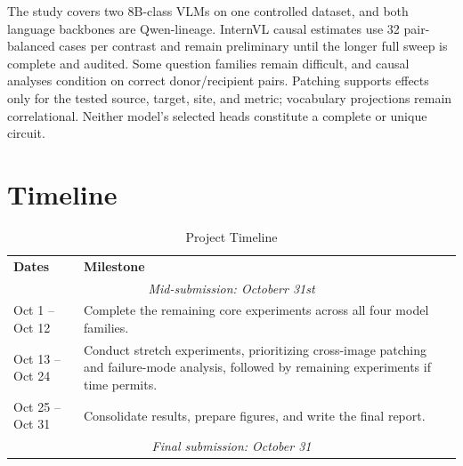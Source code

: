 \documentclass[11pt]{article}
\begin{document}
The study covers two 8B-class VLMs on one controlled dataset, and both language
backbones are Qwen-lineage. InternVL causal estimates use 32 pair-balanced
cases per contrast and remain preliminary until the longer full sweep is
complete and audited. Some question families remain difficult, and causal
analyses condition on correct donor/recipient pairs. Patching supports effects
only for the tested source, target, site, and metric; vocabulary projections
remain correlational. Neither model's selected heads constitute a complete or
unique circuit.

\section{Timeline}

\begin{table}[ht]
\centering
\small
\begin{tabularx}{\columnwidth}{@{}l X@{}}
\toprule
\textbf{Dates} & \textbf{Milestone} \\ 




\multicolumn{2}{c}{\textit{Mid-submission: Octoberr 31st}} \\

\midrule

Oct 1 -- Oct 12 
& Complete the remaining core experiments across all four model families. \\ 
\addlinespace[0.5ex]

Oct 13 -- Oct 24 
& Conduct stretch experiments, prioritizing cross-image patching and failure-mode analysis, followed by remaining experiments if time permits. \\ 
\addlinespace[0.5ex]

Oct 25 -- Oct 31 
& Consolidate results, prepare figures, and write the final report. \\

\midrule
\multicolumn{2}{c}{\textit{Final submission: October 31}} \\

\bottomrule
\end{tabularx}
\caption{Project Timeline}
\label{tab:timeline}
\end{table}
\end{document}
